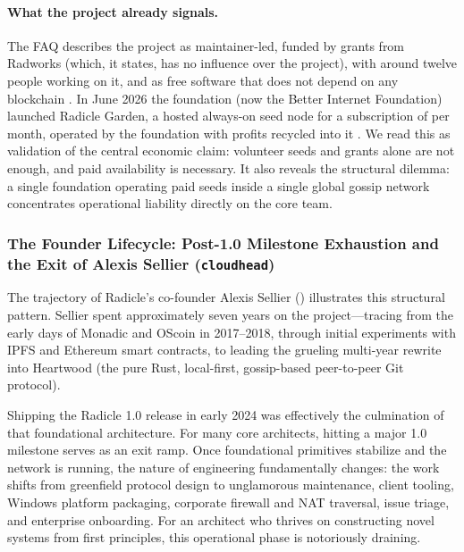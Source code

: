 \documentclass[a4paper,11pt,twoside,parskip=half-,headings=small]{scrartcl}
\begin{document}
\paragraph{What the project already signals.} The FAQ describes the project as maintainer-led, funded by grants from Radworks (which, it states, has no influence over the project), with around twelve people working on it, and as free software that does not depend on any blockchain . In June 2026 the foundation (now the Better Internet Foundation) launched Radicle Garden, a hosted always-on seed node for a subscription of  per month, operated by the foundation with profits recycled into it . We read this as validation of the central economic claim: volunteer seeds and grants alone are not enough, and paid availability is necessary. It also reveals the structural dilemma: a single foundation operating paid seeds inside a single global gossip network concentrates operational liability directly on the core team.

\subsubsection{The Founder Lifecycle: Post-1.0 Milestone Exhaustion and the Exit of Alexis Sellier (\texttt{cloudhead})}
\label{sec:cloudhead_exit}
The trajectory of Radicle's co-founder Alexis Sellier () illustrates this structural pattern. Sellier spent approximately seven years on the project---tracing from the early days of Monadic and OScoin in 2017--2018, through initial experiments with IPFS and Ethereum smart contracts, to leading the grueling multi-year rewrite into Heartwood (the pure Rust, local-first, gossip-based peer-to-peer Git protocol).

Shipping the Radicle 1.0 release in early 2024 was effectively the culmination of that foundational architecture. For many core architects, hitting a major 1.0 milestone serves as an exit ramp. Once foundational primitives stabilize and the network is running, the nature of engineering fundamentally changes: the work shifts from greenfield protocol design to unglamorous maintenance, client tooling, Windows platform packaging, corporate firewall and NAT traversal, issue triage, and enterprise onboarding. For an architect who thrives on constructing novel systems from first principles, this operational phase is notoriously draining.
\end{document}
